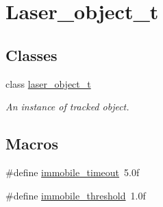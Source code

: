 \hypertarget{group__laser__object__t}{}\section{Laser\+\_\+object\+\_\+t}
\label{group__laser__object__t}
\subsection*{Classes}
\begin{DoxyCompactItemize}
\item 
class \hyperlink{classlaser__object__t}{laser\+\_\+object\+\_\+t}
\begin{DoxyCompactList}\small\item\em An instance of tracked object. \end{DoxyCompactList}\end{DoxyCompactItemize}
\subsection*{Macros}
\begin{DoxyCompactItemize}
\item 
\#define \hyperlink{group__laser__object__t_gadfe328cba5705e40f91b5cf376c3d94d}{immobile\+\_\+timeout}~5.\+0f
\item 
\#define \hyperlink{group__laser__object__t_ga102b2e08f8d8ab1ad176d1e00949c026}{immobile\+\_\+threshold}~1.\+0f
\end{DoxyCompactItemize}
